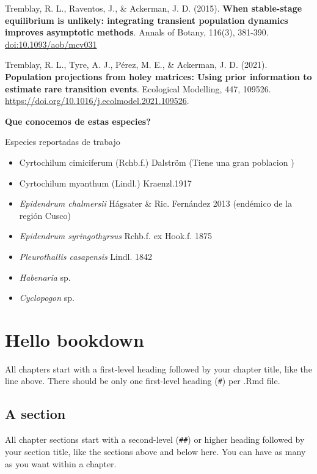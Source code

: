 \documentclass[
]{book}
\theoremstyle{definition}
\theoremstyle{definition}
\theoremstyle{definition}
\theoremstyle{definition}
\theoremstyle{remark}
\begin{document}
Tremblay, R. L., Raventos, J., \& Ackerman, J. D. (2015). \textbf{When
stable-stage equilibrium is unlikely: integrating transient population
dynamics improves asymptotic methods}. Annals of Botany, 116(3),
381-390. \url{doi:10.1093/aob/mcv031}

Tremblay, R. L., Tyre, A. J., Pérez, M. E., \& Ackerman, J. D. (2021).
\textbf{Population projections from holey matrices: Using prior information to
estimate rare transition events}. Ecological Modelling, 447, 109526.
\url{https://doi.org/10.1016/j.ecolmodel.2021.109526}.

\textbf{Que conocemos de estas especies?}

Especies reportadas de trabajo

\begin{itemize}
\item
  Cyrtochilum cimiciferum (Rchb.f.) Dalström (Tiene una gran poblacion
  )
\item
  Cyrtochilum myanthum (Lindl.) Kraenzl.1917
\item
  \emph{Epidendrum chalmersii} Hágsater \& Ric. Fernández 2013 (endémico de
  la región Cusco)
\item
  \emph{Epidendrum syringothyrsus} Rchb.f. ex Hook.f. 1875
\item
  \emph{Pleurothallis casapensis} Lindl. 1842
\item
  \emph{Habenaria} sp.
\item
  \emph{Cyclopogon} sp.
\end{itemize}

\hypertarget{hello-bookdown}{%
\chapter{Hello bookdown}\label{hello-bookdown}}

All chapters start with a first-level heading followed by your chapter title, like the line above. There should be only one first-level heading (\texttt{\#}) per .Rmd file.

\hypertarget{a-section}{%
\section{A section}\label{a-section}}

All chapter sections start with a second-level (\texttt{\#\#}) or higher heading followed by your section title, like the sections above and below here. You can have as many as you want within a chapter.
\end{document}
